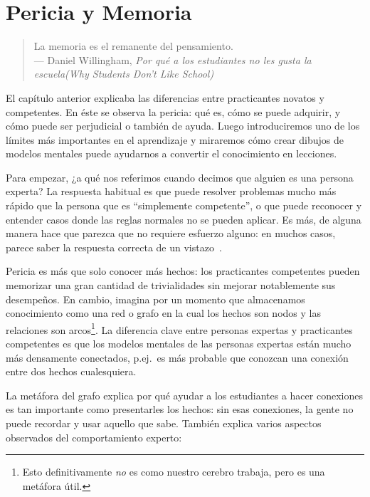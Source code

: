 \chapter{Pericia y Memoria}\label{s:memory}

\begin{quote}

  La memoria es el remanente del pensamiento. \\
  --- Daniel Willingham, \emph{Por qué a los estudiantes no les gusta la escuela(Why Students Don't Like School)}

\end{quote}

El capítulo anterior explicaba las diferencias entre practicantes novatos y competentes.
En  éste se observa la pericia:
qué es,
cómo se puede adquirir,
y cómo puede ser perjudicial o también de ayuda.
Luego introduciremos uno de los límites más importantes en el aprendizaje
y miraremos cómo crear dibujos de modelos mentales puede ayudarnos a convertir el conocimiento en lecciones.

Para empezar,
¿a qué nos referimos cuando decimos que alguien es una persona experta?
La respuesta habitual es que puede resolver problemas mucho más rápido que la persona que es “simplemente competente'',
o que puede reconocer y entender casos donde las reglas normales no se pueden aplicar.
Es más, de alguna manera hace que parezca que no requiere esfuerzo alguno:
en muchos casos,
parece saber la respuesta correcta de un vistazo~\cite{Parn2017}.

Pericia es más que solo conocer más hechos:
los practicantes competentes pueden memorizar una gran cantidad de trivialidades sin  mejorar notablemente sus desempeños.
En cambio,
imagina por un momento que almacenamos conocimiento como una red o grafo en la cual los hechos son nodos
y las relaciones son arcos\footnote{Esto definitivamente \emph{no} es como nuestro cerebro trabaja, pero es una metáfora útil.}.
La diferencia clave entre personas expertas y practicantes competentes es que
los modelos mentales de las  personas expertas están mucho más densamente conectados, 
p.ej.\ es más probable que conozcan una conexión entre dos hechos cualesquiera.

La metáfora del grafo explica por qué  ayudar a los estudiantes a hacer conexiones es tan importante como presentarles los hechos:
sin esas conexiones,
la gente no puede recordar y usar aquello que sabe.
También explica varios aspectos observados del comportamiento experto:

